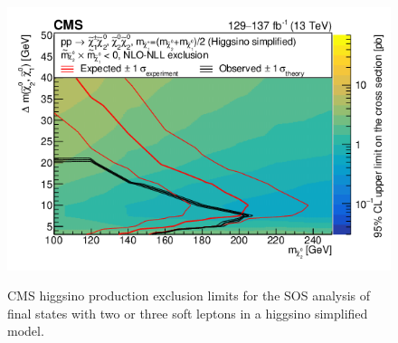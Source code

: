 \begin{figure}[!htb]
\centering
\includegraphics[width=0.80\linewidth]{plots/prev_results/cms_sos_limit.png} \\
\caption[CMS SOS higgsino production exclusion limits]{CMS higgsino production exclusion limits for the SOS analysis of final states with two or three soft leptons in a higgsino simplified model.}
\label{fig:cms-sos-limits}
\end{figure}

